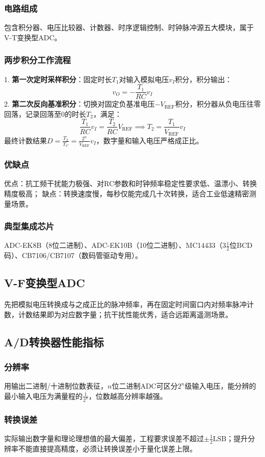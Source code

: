 \subsubsection{电路组成}
包含积分器、电压比较器、计数器、时序逻辑控制、时钟脉冲源五大模块，属于V-T变换型ADC。
\subsubsection{两步积分工作流程}
1. \textbf{第一次定时采样积分}：固定时长$T_1$对输入模拟电压$v_I$积分，积分输出：
\[
v_O=-\frac{T_1}{RC}v_I
\]
2. \textbf{第二次反向基准积分}：切换对固定负基准电压$-V_\text{REF}$积分，积分器从负电压往零回落，记录回落至0的时长$T_2$，满足：
\[
\frac{T_1}{RC}v_I=\frac{T_2}{RC}V_\text{REF} \implies T_2=\frac{T_1}{V_\text{REF}}v_I
\]
最终计数结果$D=\frac{T_2}{T_C}=\frac{2^n}{V_\text{REF}}v_I$，数字量和输入电压严格成正比。
\subsubsection{优缺点}
优点：抗工频干扰能力极强、对RC参数和时钟频率稳定性要求低、温漂小、转换精度极高；
缺点：转换速度慢，每秒仅能完成几十次转换，适合工业低速精密测量场景。
\subsubsection{典型集成芯片}
ADC-EK8B（8位二进制）、ADC-EK10B（10位二进制）、MC14433（$3\frac{1}{2}$位BCD码）、CB7106/CB7107（数码管驱动专用）。

\subsection{V-F变换型ADC}
先把模拟电压转换成与之成正比的脉冲频率，再在固定时间窗口内对频率脉冲计数，计数结果即为对应数字量；抗干扰性能优秀，适合远距离遥测场景。

\subsection{A/D转换器性能指标}
\subsubsection{分辨率}
用输出二进制/十进制位数表征，$n$位二进制ADC可区分$2^n$级输入电压，能分辨的最小输入电压为满量程的$\frac{1}{2^n}$，位数越高分辨率越强。
\subsubsection{转换误差}
实际输出数字量和理论理想值的最大偏差，工程要求误差不超过$\pm\frac{1}{2}\text{LSB}$；提升分辨率不能直接提高精度，必须让转换误差小于量化误差上限。
